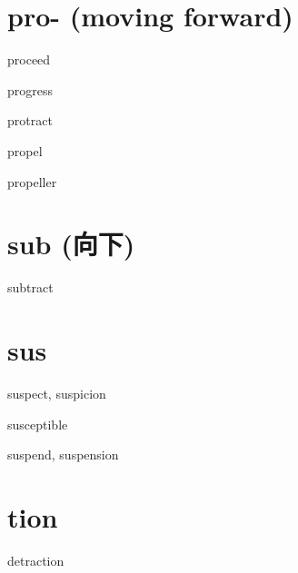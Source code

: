 \section{pro- (moving forward)}

\begin{wordRef}{proceed}
\end{wordRef}

\begin{wordRef}{progress}
\end{wordRef}

\begin{wordRef}{protract}
\end{wordRef}

\begin{wordRef}{propel}
\end{wordRef}

\begin{wordRef}{propeller}
\end{wordRef}


\section{sub (向下)}

\begin{wordRef}{subtract}
\end{wordRef}

\section{sus}

\begin{wordRef}{suspect, suspicion}
\end{wordRef}

\begin{wordRef}{susceptible}
\end{wordRef}

\begin{wordRef}{suspend, suspension}
\end{wordRef}

\section{tion}

\begin{wordRef}{detraction}
\end{wordRef}


